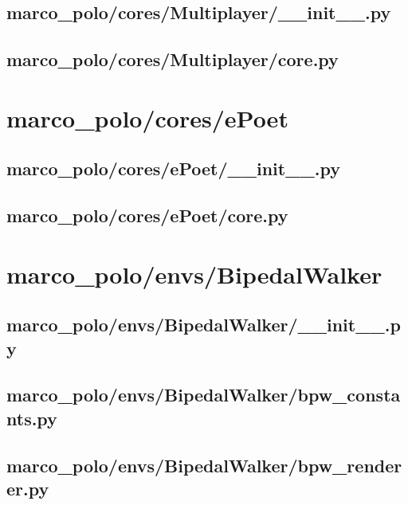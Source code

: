 \documentclass{article}
\begin{document}
\subsection[\_\_init\_\_.py]{marco\_polo/cores/Multiplayer/\_\_init\_\_.py}

\newpage

\subsection[core.py]{marco\_polo/cores/Multiplayer/core.py}

\newpage

\section{marco\_polo/cores/ePoet}
\subsection[\_\_init\_\_.py]{marco\_polo/cores/ePoet/\_\_init\_\_.py}

\newpage

\subsection[core.py]{marco\_polo/cores/ePoet/core.py}

\newpage

\section{marco\_polo/envs/BipedalWalker}
\subsection[\_\_init\_\_.py]{marco\_polo/envs/BipedalWalker/\_\_init\_\_.py}

\newpage

\subsection[bpw\_constants.py]{marco\_polo/envs/BipedalWalker/bpw\_constants.py}

\newpage

\subsection[bpw\_renderer.py]{marco\_polo/envs/BipedalWalker/bpw\_renderer.py}

\newpage
\end{document}
